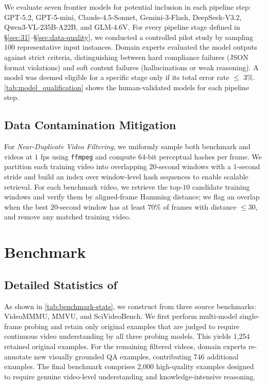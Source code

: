 We evaluate seven frontier models for potential inclusion in each pipeline step: GPT-5.2, GPT-5-mini, Claude-4.5-Sonnet, Gemini-3-Flash, DeepSeek-V3.2, Qwen3-VL-235B-A22B, and GLM-4.6V.
For every pipeline stage defined in \S\ref{sec:31}--\S\ref{sec:data-quality}, we conducted a controlled pilot study by sampling 100 representative input instances. Domain experts evaluated the model outputs against strict criteria, distinguishing between hard compliance failures (\eg JSON format violations) and soft content failures (\eg hallucinations or weak reasoning). A model was deemed eligible for a specific stage only if its total error rate $\leq$ 3\%.
\autoref{tab:model_qualification} shows the human-validated models for each pipeline step.





\subsection{Data Contamination Mitigation}\label{app:data-contamination}
For \emph{Near-Duplicate Video Filtering}, we uniformly sample both benchmark and \ours videos at $1$ fps using \texttt{ffmpeg} and compute $64$-bit perceptual hashes per frame. We partition each training video into overlapping $20$-second windows with a $1$-second stride and build an index over window-level hash sequences to enable scalable retrieval. 
For each benchmark video, we retrieve the top-$10$ candidate training windows and verify them by aligned-frame Hamming distance; we flag an overlap when the best $20$-second window has at least $70\%$ of frames with distance $\le 30$, and remove any matched training video. 

\section{\eval Benchmark}
\subsection{Detailed Statistics of \eval}
\label{app:benchmark-stat}

As shown in \autoref{tab:benchmark-stats}, we construct \eval from three source benchmarks: VideoMMMU, MMVU, and SciVideoBench. We first perform multi-model single-frame probing and retain only original examples that are judged to require continuous video understanding by all three probing models. This yields 1,254 retained original examples. For the remaining filtered videos, domain experts re-annotate new visually grounded QA examples, contributing 746 additional examples. The final benchmark comprises 2,000 high-quality examples designed to require genuine video-level understanding and knowledge-intensive reasoning.







